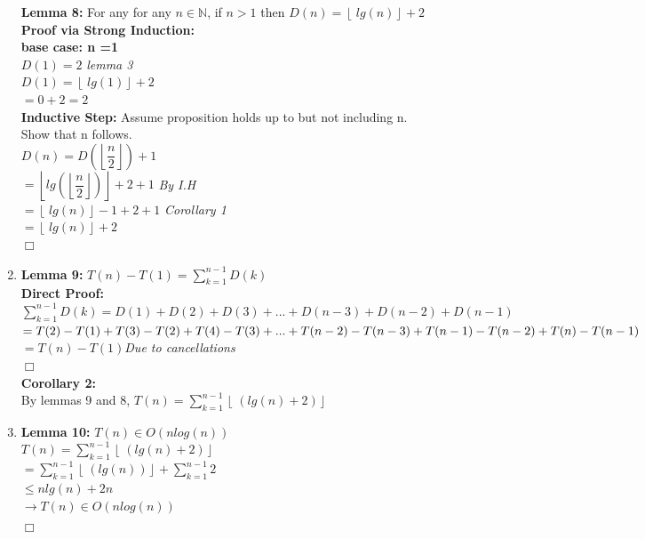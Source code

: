 \documentclass[12pt]{article}%
\begin{document}
\begin{enumerate}[label=(\alph*)]
\textbf{Lemma 8:} For any for any $n \in  \mathbb{N}$, if $n > 1$ then $D(n) = \left\lfloor\ lg(n)\right\rfloor +2$\\
\textbf{Proof via Strong Induction:}\\
\textbf{base case: n =1}\\
$D(1) = 2$ \textit{lemma 3}\\
$D(1) = \left\lfloor\ lg(1)\right\rfloor +2$\\
$= 0 + 2 = 2$\\
\textbf{Inductive Step:} Assume proposition holds up to but not including n.\\ Show that n follows.\\
$D(n) = D(\left\lfloor\dfrac{n}{2} \right\rfloor) +1$\\
$= \left\lfloor lg(\left\lfloor \dfrac{n}{2}\right\rfloor)\right\rfloor + 2 + 1$\textit{  By I.H}\\
$=\left\lfloor\ lg(n)\right\rfloor -1 + 2 + 1$ \textit{ Corollary 1}\\
$=\left\lfloor\ lg(n)\right\rfloor +2$\\
$\Box$\\

\item

\textbf{Lemma 9:} $T(n) - T(1) = \sum^{n-1}_{k = 1}D(k)$\\
\textbf{Direct Proof:}\\
$\sum^{n-1}_{k = 1}D(k) = D(1) + D(2) + D(3) + ... + D(n-3) + D(n-2) + D(n-1)$\\
$= T(2) - T(1) + T(3) - T(2) + T(4) - T(3) +\\ ... + T(n-2) - T(n-3) + T(n-1) - T(n-2) + T(n) - T(n-1)$\\
$=T(n)-T(1)$\textit{Due to cancellations}\\
$\Box$\\
\textbf{Corollary 2:}\\
By lemmas 9 and 8, $T(n) = \sum^{n-1}_{k = 1}\left\lfloor\ (lg(n) + 2)\right\rfloor$\\

\item

\textbf{Lemma 10:} $T(n) \in O(nlog(n))$\\
$T(n) = \sum^{n-1}_{k = 1}\left\lfloor\ (lg(n) + 2)\right\rfloor$\\
$= \sum^{n-1}_{k = 1}\left\lfloor\ (lg(n))\right\rfloor  + \sum^{n-1}_{k = 1}2$\\
$\leq nlg(n) + 2n$\\
$\xrightarrow[]{} T(n) \in O(nlog(n))$\\
$\Box$\\


\end{enumerate}
\end{document}
